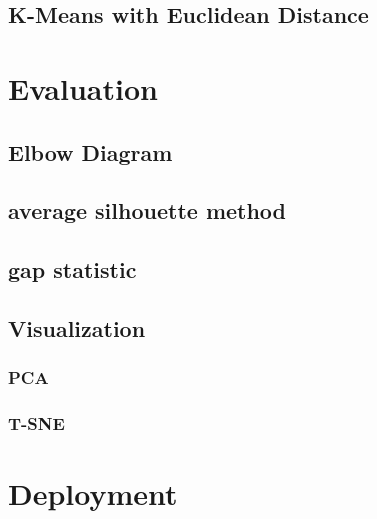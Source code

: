 	
	\subsection{K-Means with Euclidean Distance}
\section{Evaluation}
	\subsection{Elbow Diagram}
	\subsection{average silhouette method}
	\subsection{gap statistic}
	\subsection{Visualization}
		\subsubsection{PCA}
		\subsubsection{T-SNE}
\section{Deployment}
